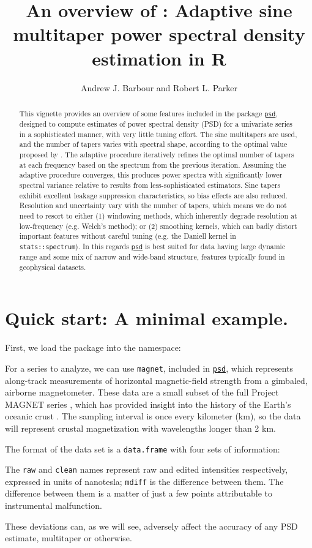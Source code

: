 \documentclass[10pt]{article}\usepackage[]{graphicx}\usepackage[]{color}
\author{Andrew J. Barbour and Robert L. Parker}
\title{An overview of \psd{}: Adaptive sine multitaper power spectral density estimation in R}
\newcommand{\Rcmd}[1]{\texttt{#1}}
\newcommand{\psd}[0]{\href{http://www.github.com/abarbour/psd/}{\color{blue}\Rcmd{psd}}}
\begin{document}
\maketitle
\begin{abstract}
  This vignette provides an overview of some 
  features included in the package \psd{}, designed to
  compute estimates of power spectral
  density (PSD) for a univariate series in a sophisticated manner,
  with very little tuning effort.
  The sine multitapers are used, and
  the number of tapers varies with spectral shape, according
  to the optimal value proposed by \citet{rs1995}.
  The adaptive procedure
  iteratively refines the optimal number of tapers at each frequency
  based on the spectrum from the previous iteration.
  Assuming the adaptive procedure converges, 
  this produces power spectra
  with significantly
  lower spectral variance 
  relative to results from less-sophisticated estimators.
  Sine tapers exhibit excellent
  leakage suppression characteristics, so bias effects
  are also reduced.
  Resolution and uncertainty vary with the number of tapers,
  which means we do
  not need to resort to either (1) windowing methods,
  which inherently degrade resolution at low-frequency
  (e.g. Welch's method); or (2) smoothing kernels,
  which can badly distort important features without careful tuning
  (e.g. the Daniell kernel in \Rcmd{stats::spectrum}).
  In this regards
  \psd{} is best suited for data having 
   large dynamic range and some mix of narrow and wide-band structure,
   features typically found in geophysical datasets.
\end{abstract}

\tableofcontents
\pagebreak



\section{Quick start: A minimal example.}
First, we load the package into the namespace:

For a series to analyze, we can use \Rcmd{magnet}, included in \psd{},
which represents along-track measurements
of horizontal magnetic-field strength from a gimbaled, airborne magnetometer.
These data are a small subset of the full Project MAGNET series \citep{coleman1992},
which has provided insight into
the history of the Earth's oceanic crust 
\citep{parker1997, obrien1999, korte2002}.
The sampling interval is
once every kilometer (km), so the data will represent
crustal magnetization with wavelengths longer than 2 km.

The format of the data set is a \Rcmd{data.frame} with four
sets of information:

The \Rcmd{raw} and \Rcmd{clean} names represent raw
and edited intensities respectively, expressed in units of nanotesla; 
\Rcmd{mdiff} is the difference between them.
The difference between them is a matter of just a few points
attributable to instrumental malfunction. 

These deviations can,
as we will see, adversely affect the accuracy of any PSD estimate,
multitaper or otherwise.
\end{document}
